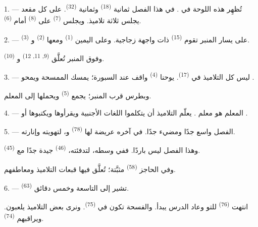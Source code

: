 \VUsaut{3.0mm}

1. --- تُظهِر هذه اللوحة  في . في هذا الفصل
ثمانية  \textsuperscript{(18)} وثمانية 
\textsuperscript{(32)}. على كل مقعد يجلس ثلاثة تلاميذ. ويجلس 
\textsuperscript{(7)} على  \textsuperscript{(8)} أمام 
\textsuperscript{(6)}.

2. --- على يسار المنبر تقوم  \textsuperscript{(15)} ذات واجهة
زجاجية. وعلى اليمين  \textsuperscript{(1)} ومعها 
\textsuperscript{(2)} و \textsuperscript{(3)}.

وفوق المنبر تُعلَّق  \textsuperscript{(9, 11, 12)}
و \textsuperscript{(10)}.

3. --- ليس كل التلاميذ في  \textsuperscript{(17)}. يوحنا
\textsuperscript{(4)} واقف عند السبورة؛ يمسك الممسحة ويمحو .

وبطرس قرب المنبر؛ يجمع  \textsuperscript{(5)} ويحملها
إلى المعلم.

4. ---  المعلم هو معلم . يعلّم التلاميذ
أن يتكلموا اللغات الأجنبية ويقرأوها ويكتبوها  أو .

5. --- الفصل واسع جدًا ومضيء جدًا. في آخره  عريضة لها
 \textsuperscript{(78)} و، لتهويته وإنارته.

وهذا الفصل ليس باردًا. ففي وسطه، لتدفئته،  \textsuperscript{(46)}
جيدة جدًا مع  \textsuperscript{(45)}.

وفي الحاجز  \textsuperscript{(58)} مثبَّتة؛ تُعلَّق فيها قبعات
التلاميذ ومعاطفهم.

\VUsaut{5.2mm}
\VUsaut{3.6mm}

6. ---  \textsuperscript{(63)} تشير إلى التاسعة وخمس دقائق.

انتهت  \textsuperscript{(76)} للتو وعاد الدرس يبدأ. والفسحة تكون
في  \textsuperscript{(75)}. ونرى بعض التلاميذ يلعبون. ويراقبهم
 \textsuperscript{(74)}.

